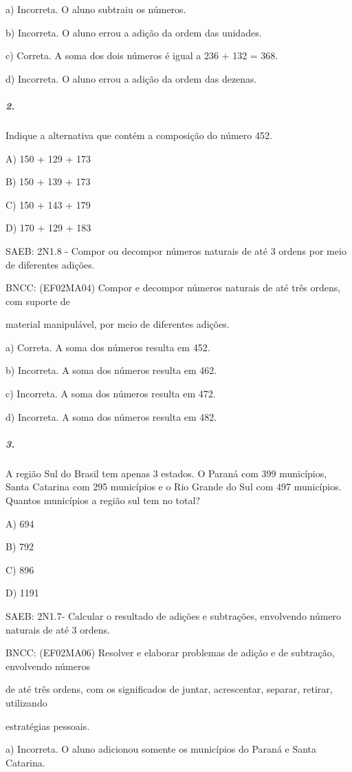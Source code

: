 a) Incorreta. O aluno subtraiu os números.

b) Incorreta. O aluno errou a adição da ordem das unidades.

c) Correta. A soma dos dois números é igual a 236 + 132 = 368.

d) Incorreta. O aluno errou a adição da ordem das dezenas.

\subparagraph{2. }\label{section-26}

Indique a alternativa que contém a composição do número 452.

A) 150 + 129 + 173

B) 150 + 139 + 173

C) 150 + 143 + 179

D) 170 + 129 + 183

SAEB: 2N1.8 - Compor ou decompor números naturais de até 3 ordens por
meio de diferentes adições.

BNCC: (EF02MA04) Compor e decompor números naturais de até três ordens,
com suporte de

material manipulável, por meio de diferentes adições.

a) Correta. A soma dos números resulta em 452.

b) Incorreta. A soma dos números resulta em 462.

c) Incorreta. A soma dos números resulta em 472.

d) Incorreta. A soma dos números resulta em 482.

\subparagraph{3. }\label{section-27}

A região Sul do Brasil tem apenas 3 estados. O Paraná com 399
municípios, Santa Catarina com 295 municípios e o Rio Grande do Sul com
497 municípios. Quantos municípios a região sul tem no total?

A) 694

B) 792

C) 896

D) 1191

SAEB: 2N1.7- Calcular o resultado de adições e subtrações, envolvendo
número naturais de até 3 ordens.

BNCC: (EF02MA06) Resolver e elaborar problemas de adição e de subtração,
envolvendo números

de até três ordens, com os significados de juntar, acrescentar, separar,
retirar, utilizando

estratégias pessoais.

a) Incorreta. O aluno adicionou somente os municípios do Paraná e Santa
Catarina.

